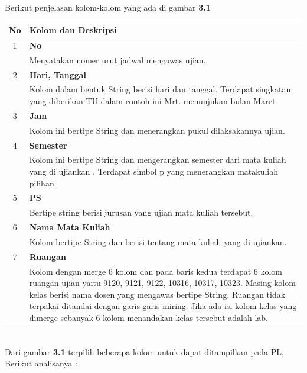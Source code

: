Berikut penjelasan kolom-kolom yang ada di gambar \textbf{3.1}\\
\begin{tabular}{|c|p{12cm}|}
		\hline
		\textbf{No} & \textbf{Kolom dan Deskripsi} \\ \hline \hline
		1 & \textbf{No}\\
			&	Menyatakan nomer urut jadwal mengawas ujian.\\ \hline
		2 & \textbf{Hari, Tanggal}\\
			&	Kolom dalam bentuk String berisi hari dan tanggal. Terdapat singkatan yang diberikan TU dalam contoh ini  Mrt. menunjukan bulan Maret\\ \hline	
		3 & \textbf{Jam}\\
			&	Kolom ini bertipe String dan menerangkan pukul dilaksakannya ujian.\\ \hline
		4 & \textbf{Semester}\\
			&	Kolom ini bertipe String dan mengerangkan semester dari mata kuliah yang di ujiankan . Terdapat simbol p yang menerangkan matakuliah pilihan\\ \hline
		5 & \textbf{PS}\\
			&	Bertipe string berisi jurusan yang ujian mata kuliah tersebut.\\ \hline
		6 & \textbf{Nama Mata Kuliah}\\
			&	Kolom bertipe String dan berisi tentang mata kuliah yang di ujiankan.\\ \hline
		7 & \textbf{Ruangan}\\
			&	Kolom dengan merge 6 kolom dan pada baris kedua terdapat 6 kolom ruangan ujian yaitu 9120, 9121, 9122, 10316, 10317, 10323. Masing kolom kelas berisi nama dosen yang mengawas bertipe String. Ruangan tidak terpakai ditandai dengan garis-garis miring. Jika ada isi kolom kelas yang dimerge sebanyak 6 kolom menandakan kelas tersebut adalah lab.\\ \hline
	\end{tabular}	
	\\
Dari gambar \textbf{3.1} terpilih beberapa kolom untuk dapat ditampilkan pada PL, Berikut analisanya :\\
